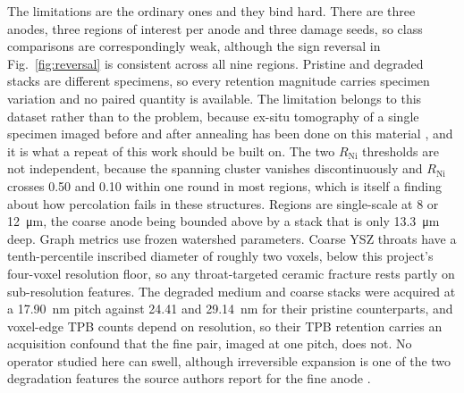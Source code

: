 \documentclass[5p,times,twocolumn]{elsarticle}
\newcommand{\Rni}{R_{\mathrm{Ni}}}
\begin{document}
The limitations are the ordinary ones and they bind hard. There are three
anodes, three regions of interest per anode and three damage seeds, so class
comparisons are correspondingly weak, although the sign reversal in
Fig.~\ref{fig:reversal} is consistent across all nine regions. Pristine and
degraded stacks are different specimens, so every retention magnitude carries
specimen variation and no paired quantity is available. The limitation belongs to this dataset rather than to the problem, because
ex-situ tomography of a single
specimen imaged before and after annealing has been done on this material
\cite{trini2021}, and it is what a repeat of this work should be built on.
The two $\Rni$
thresholds are not independent, because the spanning cluster vanishes
discontinuously and $\Rni$ crosses 0.50 and 0.10 within one round in most
regions, which is itself a finding about how percolation fails in these
structures. Regions are single-scale at 8 or \SI{12}{\micro\metre}, the coarse
anode being bounded above by a stack that is only \SI{13.3}{\micro\metre}
deep. Graph metrics use frozen watershed parameters. Coarse YSZ throats have a
tenth-percentile inscribed diameter of roughly two voxels, below this
project's four-voxel resolution floor, so any throat-targeted ceramic fracture
rests partly on sub-resolution features. The degraded medium and coarse stacks
were acquired at a \SI{17.90}{\nano\metre} pitch against 24.41 and
\SI{29.14}{\nano\metre} for their pristine counterparts, and voxel-edge TPB
counts depend on resolution, so their TPB retention carries an acquisition
confound that the fine pair, imaged at one pitch, does not. No operator
studied here can swell, although irreversible expansion is one of the two
degradation features the source authors report for the fine anode
\cite{pecho2015tpb}.
\end{document}
